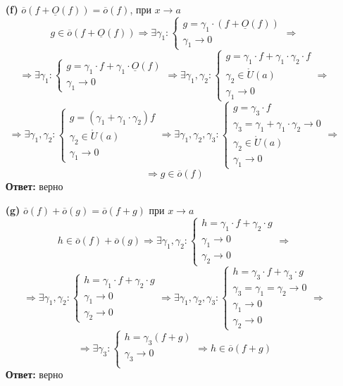 \documentclass[a4paper]{article}
\newcommand{\case}[1]{\begin{cases} #1 \end{cases}}
\renewcommand{\r}{\Rightarrow}
\newcommand{\OO}{\underline{O}}
\newcommand{\oo}{\overline{o}}
\begin{document}
\begin{enumerate}
\begin{enumerate}
        \item[\textbf{(f)}]$\oo(f + \OO(f)) = \oo(f)$, при $x \to a$
        $$g \in \oo(f + \OO(f)) \r \exists \gamma_1 : \case{
            g = \gamma_1 \cdot (f + \OO(f))\\
            \gamma_1 \to 0
        }\r$$$$\r \exists \gamma_1 : \case{
            g = \gamma_1\cdot f + \gamma_1 \cdot \OO(f)\\
            \gamma_1 \to 0
        }\r \exists \gamma_1, \gamma_2 : \case{
            g = \gamma_1\cdot f + \gamma_1 \cdot \gamma_2 \cdot f\\
            \gamma_2 \in \mathring{U}(a)\\
            \gamma_1 \to 0
        } \r$$
        $$\r \exists \gamma_1, \gamma_2 : \case{
            g = (\gamma_1  + \gamma_1 \cdot \gamma_2)f\\
            \gamma_2 \in \mathring{U}(a)\\
            \gamma_1 \to 0
        } \r \exists \gamma_1, \gamma_2, \gamma_3 : \case{
            g = \gamma_3 \cdot f\\
            \gamma_3 = \gamma_1  + \gamma_1 \cdot \gamma_2 \to 0\\
            \gamma_2 \in \mathring{U}(a)\\
            \gamma_1 \to 0
        } \r$$
        $$\r g \in \oo(f)$$
        \textbf{Ответ: } верно

        \item[\textbf{(g)}]$ \oo(f) + \oo(g) = \oo(f + g)$ при $x \to a$
        $$h \in \oo(f) + \oo(g) \r \exists \gamma_1, \gamma_2 : \case{
            h = \gamma_1 \cdot f + \gamma_2 \cdot g\\
            \gamma_1 \to 0\\
            \gamma_2 \to 0
        }\r$$$$\r \exists \gamma_1, \gamma_2 : \case{
            h = \gamma_1 \cdot f + \gamma_2 \cdot g\\
            \gamma_1 \to 0\\
            \gamma_2 \to 0
        }\r \exists \gamma_1, \gamma_2, \gamma_3 : \case{
            h = \gamma_3 \cdot f + \gamma_3 \cdot g\\
            \gamma_3 = \gamma_1 = \gamma_2 \to 0\\
            \gamma_1 \to 0\\
            \gamma_2 \to 0
        }\r $$
        $$\r \exists \gamma_3 : \case{
            h = \gamma_3(f +  g)\\
            \gamma_3 \to 0\\
        } \r h \in \oo(f+g)$$
        \textbf{Ответ: } верно \\


\end{enumerate}
\end{enumerate}
\end{document}
